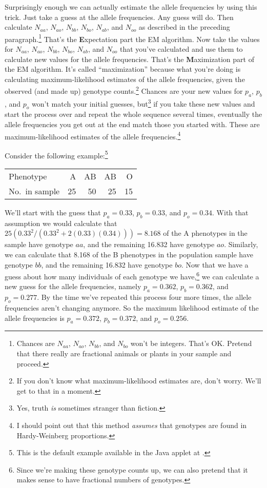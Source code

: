 \documentclass[12pt]{article}
\begin{document}
Surprisingly enough we can actually estimate the allele frequencies by
using this trick. Just take a guess at the allele frequencies. Any
guess will do. Then calculate $N_{aa}$, $N_{ao}$, $N_{bb}$, $N_{bo}$,
$N_{ab}$, and $N_{oo}$ as described in the preceding
paragraph.\footnote{Chances are $N_{aa}$, $N_{ao}$, $N_{bb}$, and
  $N_{bo}$ won't be integers. That's OK. Pretend that there really are
  fractional animals or plants in your sample and proceed.} That's the
{\bf E}xpectation part the EM algorithm. Now take the values for
$N_{aa}$, $N_{ao}$, $N_{bb}$, $N_{bo}$, $N_{ab}$, and $N_{oo}$ that
you've calculated and use them to calculate new values for the allele
frequencies. That's the {\bf M}aximization part of the EM
algorithm. It's called ``maximization'' because what you're doing is
calculating maximum-likelihood estimates of the allele frequencies,
given the observed (and made up) genotype counts.\footnote{If you
  don't know what maximum-likelihood estimates are, don't worry. We'll
  get to that in a moment.} Chances are your new values for $p_a$,
$p_b$, and $p_o$ won't match your initial guesses, but\footnote{Yes,
  truth {\it is\/} sometimes stranger than fiction.}  if you take
these new values and start the process over and repeat the whole
sequence several times, eventually the allele frequencies you get out
at the end match those you started with. These are maximum-likelihood
estimates of the allele frequencies.\footnote{I should point out that
  this method {\it assumes\/} that genotypes are found in
  Hardy-Weinberg proportions.}

Consider the following example:\footnote{This is the default example
available in the Java applet at
.}
\begin{center}
\begin{tabular}{l|rrrr}
\hline\hline
Phenotype      & A      & AB      & AB     & O  \\
No.\ in sample & 25     & 50      & 25     & 15 \\
\hline
\end{tabular}
\end{center}
We'll start with the guess that $p_a = 0.33$, $p_b = 0.33$, and $p_o =
0.34$. With that assumption we would calculate that $25(0.33^2/(0.33^2
+ 2(0.33)(0.34))) = 8.168$ of the A phenotypes in the sample have
genotype $aa$, and the remaining 16.832 have genotype $ao$. Similarly,
we can calculate that 8.168 of the B phenotypes in the population
sample have genotype $bb$, and the remaining 16.832 have genotype
$bo$. Now that we have a guess about how many individuals of each
genotype we have,\footnote{Since we're making these genotype counts
  up, we can also pretend that it makes sense to have fractional
  numbers of genotypes.} we can calculate a new guess for the allele
frequencies, namely $p_a = 0.362$, $p_b = 0.362$, and $p_o =
0.277$. By the time we've repeated this process four more times, the
allele frequencies aren't changing anymore. So the maximum likelihood
estimate of the allele frequencies is $p_a = 0.372$, $p_b = 0.372$,
and $p_o = 0.256$.
\end{document}
